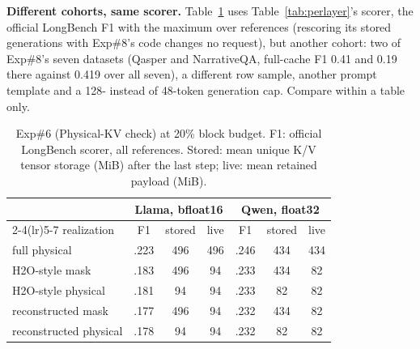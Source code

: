 \textbf{Different cohorts, same scorer.} Table~\ref{tab:physical} uses
Table~\ref{tab:perlayer}'s scorer, the official LongBench F1 with the maximum over
references (rescoring its stored generations with Exp\#8's code changes no request),
but another cohort: two of Exp\#8's seven datasets (Qasper and NarrativeQA, full-cache
F1 0.41 and 0.19 there against 0.419 over all seven), a different row sample, another
prompt template and a 128- instead of 48-token generation cap. Compare within a table only.

\begin{table}[t]
\centering
\caption{Exp\#6 (Physical-KV check) at 20\% block budget. F1: official LongBench
scorer, all references. Stored: mean unique K/V tensor storage (MiB) after the last
step; live: mean retained payload (MiB).}
\label{tab:physical}
\footnotesize
\setlength{\tabcolsep}{1.6pt}
\begin{tabular*}{\columnwidth}{@{\extracolsep{\fill}}lcccccc@{}}
\toprule
 & \multicolumn{3}{c}{Llama, bfloat16} & \multicolumn{3}{c}{Qwen, float32} \\
\cmidrule(lr){2-4}\cmidrule(lr){5-7}
realization & F1 & stored & live & F1 & stored & live \\
\midrule
full physical & .223 & 496 & 496 & .246 & 434 & 434 \\
H2O-style mask & .183 & 496 & 94 & .233 & 434 & 82 \\
H2O-style physical & .181 & 94 & 94 & .233 & 82 & 82 \\
reconstructed mask & .177 & 496 & 94 & .232 & 434 & 82 \\
reconstructed physical & .178 & 94 & 94 & .232 & 82 & 82 \\
\bottomrule
\end{tabular*}
\end{table}
